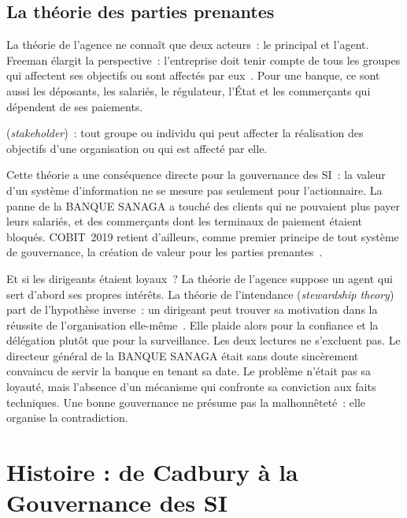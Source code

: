 \subsection{La théorie des parties prenantes}

La théorie de l'agence ne connaît que deux acteurs~: le principal et
l'agent. Freeman élargit la perspective~: l'entreprise doit tenir compte
de tous les groupes qui affectent ses objectifs ou sont affectés par
eux~\cite{freeman1984stakeholder}. Pour une banque, ce sont aussi les
déposants, les salariés, le régulateur, l'État et les commerçants qui
dépendent de ses paiements.

\begin{boxdef}
 (\textit{stakeholder})~:
tout groupe ou individu qui peut affecter la réalisation des objectifs
d'une organisation ou qui est affecté par elle.
\end{boxdef}

Cette théorie a une conséquence directe pour la gouvernance des SI~: la
valeur d'un système d'information ne se mesure pas seulement pour
l'actionnaire. La panne de la BANQUE SANAGA a touché des clients qui ne
pouvaient plus payer leurs salariés, et des commerçants dont les terminaux
de paiement étaient bloqués. COBIT~2019 retient d'ailleurs, comme premier
principe de tout système de gouvernance, la création de valeur pour les
parties prenantes~\cite{isaca2018cobitintro}.

\begin{boiteRemarque}{Et si les dirigeants étaient loyaux~?}
La théorie de l'agence suppose un agent qui sert d'abord ses propres
intérêts. La théorie de l'intendance (\textit{stewardship theory}) part de
l'hypothèse inverse~: un dirigeant peut trouver sa motivation dans la
réussite de l'organisation elle-même~\cite{davis1997stewardship}. Elle
plaide alors pour la confiance et la délégation plutôt que pour la
surveillance. Les deux lectures ne s'excluent pas. Le directeur général de
la BANQUE SANAGA était sans doute sincèrement convaincu de servir la
banque en tenant sa date. Le problème n'était pas sa loyauté, mais
l'absence d'un mécanisme qui confronte sa conviction aux faits techniques.
Une bonne gouvernance ne présume pas la malhonnêteté~: elle organise la
contradiction.
\end{boiteRemarque}

\section{Histoire : de Cadbury à la Gouvernance des SI}
\label{sec:c01-histoire}

